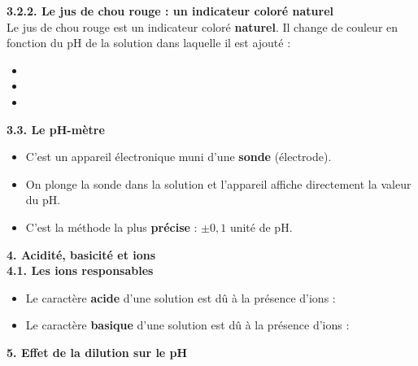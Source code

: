 \documentclass[11pt,a4paper]{article}
\newcommand{\trou}{\dotfill}
\begin{document}
\vspace{3mm}

\textbf{3.2.2. Le jus de chou rouge : un indicateur coloré naturel} \\

Le jus de chou rouge est un indicateur coloré \textbf{naturel}. Il change de couleur en fonction du pH de la solution dans laquelle il est ajouté :

\begin{tcolorbox}[colback=red!5!white,colframe=red!75!black]
{
\vspace{8mm}
\begin{itemize}
    \item \trou \vspace{3mm}
    \item \trou \vspace{3mm}
    \item \trou
\end{itemize}
}
\end{tcolorbox}

\textbf{3.3. Le pH-mètre}

\begin{itemize}
    \item C'est un appareil électronique muni d'une \textbf{sonde} (électrode).
    \item On plonge la sonde dans la solution et l'appareil affiche directement la valeur du pH.
    \item C'est la méthode la plus \textbf{précise} : $\pm 0{,}1$ unité de pH.
\end{itemize}

\newpage

\textbf{4. Acidité, basicité et ions} \\

\textbf{4.1. Les ions responsables}

\begin{tcolorbox}[colback=red!5!white,colframe=red!75!black]
{
\vspace{8mm}
\begin{itemize}
    \item Le caractère \textbf{acide} d'une solution est dû à la présence d'ions \trou{} : \trou
    \item Le caractère \textbf{basique} d'une solution est dû à la présence d'ions \trou{} : \trou
\end{itemize}
}
\end{tcolorbox}


\textbf{5. Effet de la dilution sur le pH} \\
\end{document}
